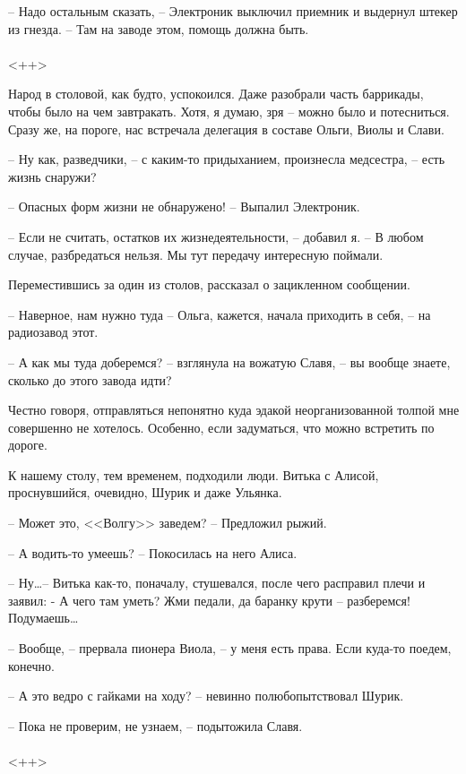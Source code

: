 \documentclass[a4paper]{book}
\begin{document}
-- Надо остальным сказать, -- Электроник выключил приемник и выдернул штекер из гнезда. -- Там на заводе этом, помощь должна быть.

\paragraph{}<++>

Народ в столовой, как будто, успокоился. Даже разобрали часть баррикады, чтобы было на чем завтракать. Хотя, я думаю, зря -- можно было и потесниться. Сразу же, на пороге, нас встречала делегация в составе Ольги, Виолы и Слави.

-- Ну как, разведчики, -- с каким-то придыханием, произнесла медсестра, -- есть жизнь снаружи?

-- Опасных форм жизни не обнаружено! -- Выпалил Электроник.

-- Если не считать, остатков их жизнедеятельности, -- добавил я. -- В любом случае, разбредаться нельзя. Мы тут передачу интересную поймали.

Переместившись за один из столов, рассказал о зацикленном сообщении.

-- Наверное, нам нужно туда -- Ольга, кажется, начала приходить в себя, -- на радиозавод этот.

-- А как мы туда доберемся? -- взглянула на вожатую Славя, -- вы вообще знаете, сколько до этого завода идти?

Честно говоря, отправляться непонятно куда эдакой неорганизованной толпой мне совершенно не хотелось. Особенно, если задуматься, что можно встретить по дороге.

К нашему столу, тем временем, подходили люди. Витька с Алисой, проснувшийся, очевидно, Шурик и даже Ульянка.

-- Может это, <<Волгу>> заведем? -- Предложил рыжий.

-- А водить-то умеешь? -- Покосилась на него Алиса. 

-- Ну\ldots -- Витька как-то, поначалу, стушевался, после чего расправил плечи и заявил: - А чего там уметь? Жми педали, да баранку крути -- разберемся! Подумаешь\ldots

-- Вообще, -- прервала пионера Виола, -- у меня есть права. Если куда-то поедем, конечно. 

-- А это ведро с гайками на ходу? -- невинно полюбопытствовал Шурик.

-- Пока не проверим, не узнаем, -- подытожила Славя.

\paragraph{}<++>
\end{document}
